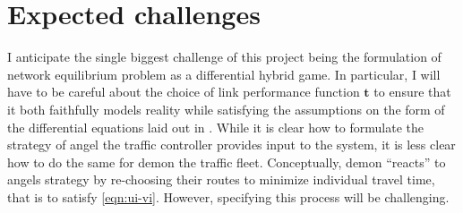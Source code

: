 \section{Expected challenges}

I anticipate the single biggest challenge of this project being the formulation of network equilibrium problem as a differential hybrid game.
In particular, I will have to be careful about the choice of link performance function $\mathbf{t}$ to ensure that it both faithfully models reality while satisfying the assumptions on the form of the differential equations laid out in \citet{DBLP:journals/tocl/Platzer17}.
While it is clear how to formulate the strategy of angel the traffic controller provides input to the system, it is less clear how to do the same for demon the traffic fleet.
Conceptually, demon ``reacts'' to angels strategy by re-choosing their routes to minimize individual travel time, that is to satisfy \eqref{eqn:ui-vi}.
However, specifying this process will be challenging.